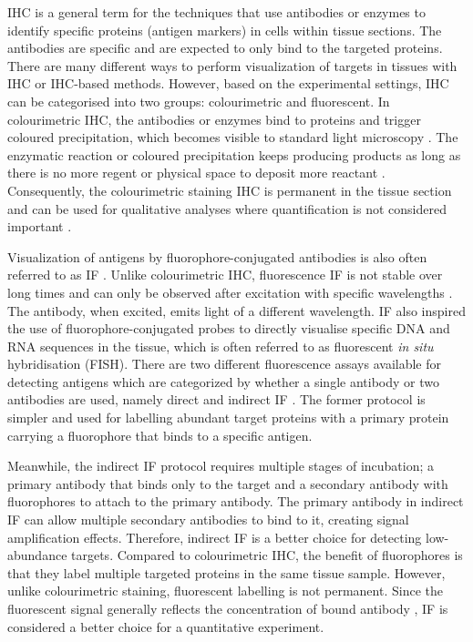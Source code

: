 IHC is a general term for the techniques that use antibodies or enzymes to identify specific proteins (antigen markers) in cells within tissue sections. The antibodies are specific and are expected to only bind to the targeted proteins. There are many different ways to perform visualization of targets in tissues with IHC or IHC-based methods. However, based on the experimental settings, IHC can be categorised into two groups: colourimetric and fluorescent. In colourimetric IHC, the antibodies or enzymes bind to proteins and trigger coloured precipitation, which becomes visible to standard light microscopy \cite{BOURGEOIS2014132}. The enzymatic reaction or coloured precipitation keeps producing products as long as there is no more regent or physical space to deposit more reactant \cite{corthell2014basic}. Consequently, the colourimetric staining IHC is permanent in the tissue section and can be used for qualitative analyses where quantification is not considered important \cite{seidal2001interpretation}. 

Visualization of antigens by fluorophore-conjugated antibodies is also often referred to as IF \cite{joshi2017immunofluorescence}. Unlike colourimetric IHC, fluorescence IF is not stable over long times and can only be observed after excitation with specific wavelengths \cite{corthell2014basic}. The antibody, when excited, emits light of a different wavelength. IF also inspired the use of fluorophore-conjugated probes to directly visualise specific DNA and RNA sequences in the tissue, which is often referred to as fluorescent \textit{in situ} hybridisation (FISH). There are two different fluorescence assays available for detecting antigens which are categorized by whether a single antibody or two antibodies are used, namely direct and indirect IF \cite{JOSHI2017135}. The former protocol is simpler and used for labelling abundant target proteins with a primary protein carrying a fluorophore that binds to a specific antigen.

Meanwhile, the indirect IF protocol requires multiple stages of incubation; a primary antibody that binds only to the target and a secondary antibody with fluorophores to attach to the primary antibody. The primary antibody in indirect IF can allow multiple secondary antibodies to bind to it, creating signal amplification effects. Therefore, indirect IF is a better choice for detecting low-abundance targets. Compared to colourimetric IHC, the benefit of fluorophores is that they label multiple targeted proteins in the same tissue sample. However, unlike colourimetric staining, fluorescent labelling is not permanent. Since the fluorescent signal generally reflects the concentration of bound antibody \cite{dabbs2017diagnostic}, IF is considered a better choice for a quantitative experiment.


